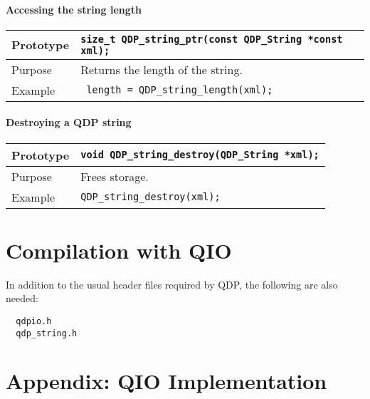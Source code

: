 \documentclass{article}
\newcommand{\QMDhandle}{{\tt QDP\_String }}
\begin{document}
\paragraph{Accessing the string length}

\begin{flushleft}
  \begin{tabular}{|l|l|}
  \hline
  Prototype      & \verb|size_t QDP_string_ptr(const |\QMDhandle \verb|*const xml);|\\
    \hline
  Purpose        & Returns the length of the string. \\
   \hline
  Example        & \verb| length = QDP_string_length(xml);| \\
   \hline
 \end{tabular}
\end{flushleft}
%
\paragraph{Destroying a QDP string}

\begin{flushleft}
  \begin{tabular}{|l|l|}
  \hline
  Prototype      & \verb|void QDP_string_destroy(|\QMDhandle \verb|*xml);|\\
    \hline
  Purpose        & Frees storage. \\
   \hline
  Example        & \verb|QDP_string_destroy(xml);| \\
   \hline
 \end{tabular}
\end{flushleft}
%


\section{Compilation with QIO}

In addition to the usual header files required by QDP, the following
are also needed:
%
\begin{verbatim}
  qdpio.h
  qdp_string.h
\end{verbatim}
%

\section{Appendix: QIO Implementation}
\end{document}
